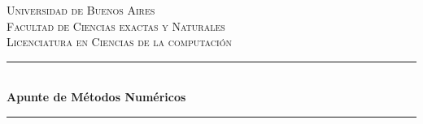\documentclass[]{article}
\begin{document}
\newcommand{\fdos}[4]{
	\left\{
		\begin{array}{lll}
			#1 & \mbox{si } #2 \\
			#3 & \mbox{si } #4
		\end{array}
	\right.
}

\newcommand{\ftres}[6]{
	\left\{
		\begin{array}{lll}
			#1 & \mbox{if } #2 \\
			#3 & \mbox{if } #4 \\
			#5 & \mbox{if } #6
		\end{array}
	\right.
}

\newcommand{\gran}[1]{\mbox{\Huge{#1}}}
\newcommand{\grand}[1]{\mbox{\Large{#1}}}

\begin{titlepage}

\newcommand{\HRule}{\rule{\linewidth}{0.5mm}} %

\center %


\textsc{\LARGE Universidad de Buenos Aires}\\[1.5cm] %
\textsc{\Large Facultad de Ciencias exactas y Naturales}\\[0.5cm] %
\textsc{\large Licenciatura en Ciencias de la computación}\\[0.5cm] %


\HRule \\[0.4cm]
{ \huge \bfseries Apunte de Métodos Numéricos}\\[0.4cm] %
\HRule \\[1.5cm]

%


\end{titlepage}
\end{document}
